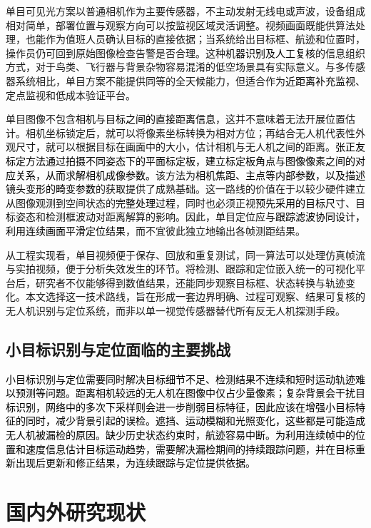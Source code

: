 单目可见光方案以普通相机作为主要传感器，不主动发射无线电或声波，设备组成相对简单，部署位置与观察方向可以按监视区域灵活调整。视频画面既能供算法处理，也能作为值班人员确认目标的直接依据；当系统给出目标框、航迹和位置时，操作员仍可回到原始图像检查告警是否合理。这种\textcolor{black}{机器识别及人工复核}的信息组织方式，对于鸟类、飞行器与背景杂物容易混淆的低空场景具有实际意义。与多传感器系统相比，单目方案不能提供同等的全天候能力，但适合作为\textcolor{black}{近距离补充监视}、定点监视和低成本验证平台。

单目图像不包含\textcolor{black}{相机与目标之间的直接距离信息}，这并不意味着无法开展位置估计。相机坐标锁定后，就可以将像素坐标转换为相对方位；再结合无人机代表性外观尺寸，就可以根据目标在画面中的大小，估计相机与无人机之间的距离。\textcolor{black}{张正友标定方法通过拍摄不同姿态下的平面标定板，建立标定板角点与图像像素之间的对应关系，从而求解相机成像参数。}该方法为\textcolor{black}{相机焦距、主点等内部参数，以及描述镜头变形的畸变参数}的获取提供了成熟基础\cite{zhang_calib}。这一路线的价值在于以较少硬件建立从图像观测到空间状态的\textcolor{black}{完整处理过程}，同时也必须正视\textcolor{black}{预先采用的目标尺寸}、目标姿态和检测框波动对距离解算的影响。因此，单目定位应与\textcolor{black}{跟踪滤波协同设计，利用连续画面平滑定位结果}，而不宜彼此独立地输出各帧测距结果。

从工程实现看，单目视频便于保存、回放和重复测试，同一算法可以处理仿真帧流与实拍视频，便于分析失效发生的环节。将检测、跟踪和定位嵌入统一的可视化平台后，研究者不仅能够得到数值结果，还能同步观察目标框、状态转换与轨迹变化。本文选择这一技术路线，旨在形成一套边界明确、过程可观察、结果可复核的无人机识别与定位系统，而非以单一视觉传感器替代所有反无人机探测手段。

\subsection{小目标识别与定位面临的主要挑战}

\textcolor{black}{小目标识别与定位需要同时解决目标细节不足、检测结果不连续和短时运动轨迹难以预测等问题。距离相机较远的无人机在图像中仅占少量像素；复杂背景会干扰目标识别，网络中的多次下采样则会进一步削弱目标特征，因此应该在增强小目标特征的同时，减少背景引起的误检。遮挡、运动模糊和光照变化，这些都是可能造成无人机被漏检的原因。缺少历史状态约束时，航迹容易中断。为利用连续帧中的位置和速度信息估计目标运动趋势，需要解决漏检期间的持续跟踪问题，并在目标重新出现后更新和修正结果，为连续跟踪与定位提供依据。}

\section{国内外研究现状}

